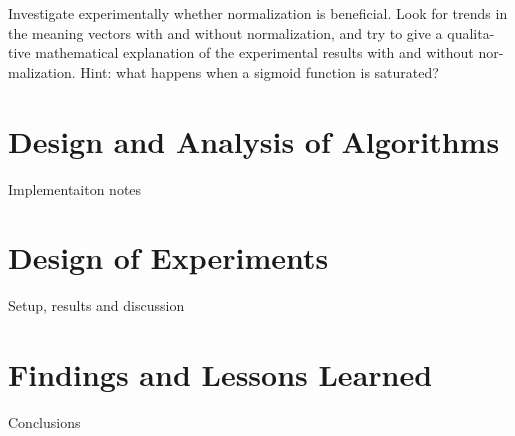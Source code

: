 \documentclass[10pt,twocolumn,letterpaper]{article}
\begin{document}
Investigate experimentally whether normalization is beneficial. Look for trends in the meaning vectors with and without normalization, and try to give a qualita- tive mathematical explanation of the experimental results with and without nor- malization. Hint: what happens when a sigmoid function is saturated?


\section{Design and Analysis of Algorithms}
Implementaiton notes


\section{Design of Experiments}
Setup, results and discussion



\section{Findings and Lessons Learned}
Conclusions








{\small


}
\end{document}
